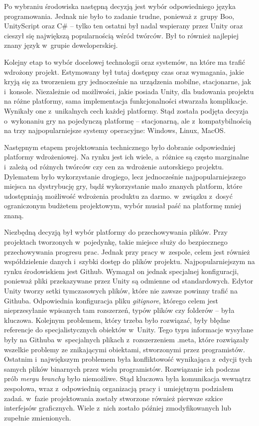 \documentclass[oneside,polski,logo]{amuthesis}
\begin{document}
Po wybraniu środowiska następną decyzją jest wybór odpowiedniego języka programowania. Jednak nie było to zadanie trudne, ponieważ z~grupy Boo, UnityScript oraz C\# – tylko ten ostatni był nadal wspierany przez Unity oraz cieszył się największą popularnością wśród twórców. Był to również najlepiej znany język w~grupie deweloperskiej.

Kolejny etap to wybór docelowej technologii oraz systemów, na które ma trafić wdrożony projekt. Estymowany był tutaj dostępny czas oraz wymagania, jakie kryją się za tworzeniem gry jednocześnie na urządzenia mobilne, stacjonarne, jak i~konsole. Niezależnie od możliwości, jakie posiada Unity, dla budowania projektu na różne platformy, sama implementacja funkcjonalności stwarzała komplikacje. Wynikały one z~unikalnych cech każdej platformy. Stąd została podjęta decyzja o~wykonaniu gry na pojedynczą platformę – stacjonarną, ale z~kompatybilnością na trzy najpopularniejsze systemy operacyjne: Windows, Linux, MacOS.

Następnym etapem projektowania technicznego było dobranie odpowiedniej platformy wdrożeniowej. Na rynku jest ich wiele, a~różnice są często marginalne i~zależą od różnych twórców czy cen za wdrożenie autorskiego projektu. Dylematem było wykorzystanie drogiego, lecz jednocześnie najpopularniejszego miejsca na dystrybucję gry, bądź wykorzystanie mało znanych platform, które udostępniają możliwość wdrożenia produktu za darmo. w~związku z~dosyć ograniczonym budżetem projektowym, wybór musiał paść na platformę mniej znaną.

Niezbędną decyzją był wybór platformy do przechowywania plików. Przy projektach tworzonych w~pojedynkę, takie miejsce służy do bezpiecznego przechowywania progresu prac. Jednak przy pracy w~zespole, celem jest również współdzielenie danych i~szybki dostęp do plików projektu. Najpopularniejszym na rynku środowiskiem jest Github. Wymagał on jednak specjalnej konfiguracji, ponieważ pliki przekazywane przez Unity są odmienne od standardowych. Edytor Unity tworzy setki tymczasowych plików, które nie zawsze powinny trafić na Githuba. Odpowiednia konfiguracja pliku \emph{gitignore}, którego celem jest nieprzesyłanie wpisanych tam rozszerzeń, typów plików czy folderów – była kluczowa. Kolejnym problemem, który trzeba było rozwiązać, były błędne referencje do specjalistycznych obiektów w~Unity. Tego typu informacje wysyłane były na Githuba w~specjalnych plikach z~rozszerzeniem .meta, które rozwiązały wszelkie problemy ze znikającymi obiektami, stworzonymi przez programistów. Ostatnim i~największym problemem była konfliktowość wynikająca z~edycji tych samych plików binarnych przez wielu programistów. Rozwiązanie ich podczas prób \emph{mergu branchy} było niemożliwe. Stąd kluczowa była komunikacja wewnątrz zespołowa, wraz z~odpowiednią organizacją pracy i~umiejętnym podziałem zadań. w~fazie projektowania zostały stworzone również pierwsze szkice interfejsów graficznych. Wiele z~nich zostało później zmodyfikowanych lub zupełnie zmienionych.
\end{document}
